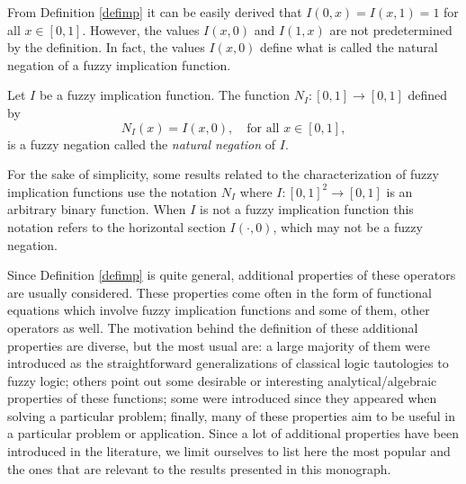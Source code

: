 From Definition \ref{defimp} it can be easily derived that $I(0,x) = I(x,1) = 1$ for all $x \in [0, 1]$. However, the values $I(x,0)$ and $I(1,x)$ are not predetermined by the definition. In fact, the values $I(x,0)$ define what is called the natural negation of a fuzzy implication function.
\begin{definition}\label{def:naturalnegationI}
	Let $I$ be a fuzzy implication function. The function $N_I:[0,1] \to [0,1]$ defined by
	$$N_I(x)=I(x,0), \quad \text{for all } x \in [0,1],$$
	is a fuzzy negation called the \emph{natural negation} of $I$.
\end{definition}

\begin{remark}
	For the sake of simplicity, some results related to the characterization of fuzzy implication functions use the notation $N_I$ where $I:[0,1]^2 \to [0,1]$ is an arbitrary binary function. When $I$ is not a fuzzy implication function this notation refers to the horizontal section $I(\cdot,0)$, which may not be a fuzzy negation.
\end{remark}

Since Definition \ref{defimp} is quite general, additional properties of these operators are usually considered. These properties come often in the form of functional equations which involve fuzzy implication functions and some of them, other operators as well. The motivation behind the definition of these additional properties are diverse, but the most usual are: a large majority of them were introduced as the straightforward generalizations of classical logic tautologies to fuzzy logic; others point out some desirable or interesting analytical/algebraic properties of these functions; some were introduced since they appeared when solving a particular problem; finally, many of these properties aim to be useful in a particular problem or application. Since a lot of additional properties have been introduced in the literature, we limit ourselves to list here the most popular and the ones that are relevant to the results presented in this monograph.

